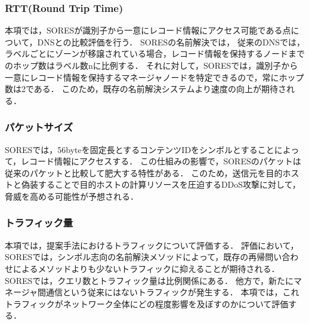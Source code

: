 \subsubsection{RTT(Round Trip Time)}
本項では，SORESが識別子から一意にレコード情報にアクセス可能である点について，DNSとの比較評価を行う．
SORESの名前解決では，
従来のDNSでは，ラベルごとにゾーンが移譲されている場合，レコード情報を保持するノードまでのホップ数はラベル数nに比例する．
それに対して，SORESでは，識別子から一意にレコード情報を保持するマネージャノードを特定できるので，常にホップ数は2である．
このため，既存の名前解決システムより速度の向上が期待される．
\subsubsection{パケットサイズ}
SORESでは，56byteを固定長とするコンテンツIDをシンボルとすることによって，レコード情報にアクセスする．
この仕組みの影響で，SORESのパケットは従来のパケットと比較して肥大する特性がある．
このため，送信元を目的ホストと偽装することで目的ホストの計算リソースを圧迫するDDoS攻撃に対して，脅威を高める可能性が予想される．
\subsubsection{トラフィック量}
本項では，提案手法におけるトラフィックについて評価する．
評価において，
SORESでは，シンボル志向の名前解決メソッドによって，既存の再帰問い合わせによるメソッドよりも少ないトラフィックに抑えることが期待される．
SORESでは，クエリ数とトラフィック量は比例関係にある．
他方で，新たにマネージャ間通信という従来にはないトラフィックが発生する．
本項では，これトラフィックがネットワーク全体にどの程度影響を及ぼすのかについて評価する．

